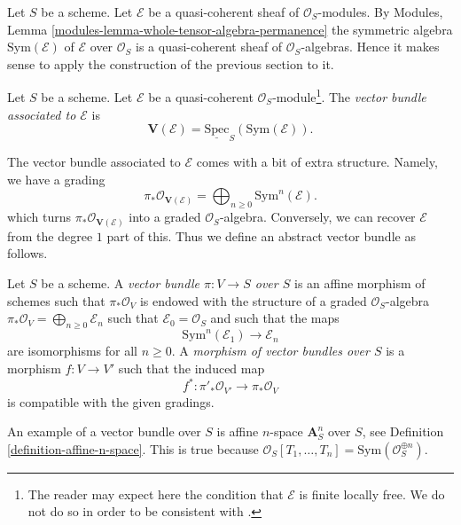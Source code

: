 \noindent
Let $S$ be a scheme.
Let $\mathcal{E}$ be a quasi-coherent sheaf of $\mathcal{O}_S$-modules.
By Modules, Lemma \ref{modules-lemma-whole-tensor-algebra-permanence}
the symmetric algebra $\text{Sym}(\mathcal{E})$ of
$\mathcal{E}$ over $\mathcal{O}_S$
is a quasi-coherent sheaf of $\mathcal{O}_S$-algebras.
Hence it makes sense to apply the construction of the
previous section to it.

\begin{definition}
\label{definition-vector-bundle}
Let $S$ be a scheme. Let $\mathcal{E}$ be a quasi-coherent
$\mathcal{O}_S$-module\footnote{The reader may expect here
the condition that $\mathcal{E}$ is finite locally free. We do not
do so in order to be consistent with \cite[II, Definition 1.7.8]{EGA}.}.
The {\it vector bundle associated to $\mathcal{E}$} is
$$
\mathbf{V}(\mathcal{E}) = \underline{\text{Spec}}_S(\text{Sym}(\mathcal{E})).
$$
\end{definition}

\noindent
The vector bundle associated to $\mathcal{E}$ comes with a bit
of extra structure. Namely, we have a grading
$$
\pi_*\mathcal{O}_{\mathbf{V}(\mathcal{E})} =
\bigoplus\nolimits_{n \geq 0} \text{Sym}^n(\mathcal{E}).
$$
which turns $\pi_*\mathcal{O}_{\mathbf{V}(\mathcal{E})}$
into a graded $\mathcal{O}_S$-algebra. Conversely, we can recover
$\mathcal{E}$ from the degree $1$ part of this.
Thus we define an abstract vector bundle as follows.

\begin{definition}
\label{definition-abstract-vector-bundle}
Let $S$ be a scheme. A {\it vector bundle $\pi : V \to S$ over $S$} is an
affine morphism of schemes such that $\pi_*\mathcal{O}_V$ is endowed with
the structure of a graded $\mathcal{O}_S$-algebra
$\pi_*\mathcal{O}_V = \bigoplus\nolimits_{n \geq 0} \mathcal{E}_n$
such that $\mathcal{E}_0 = \mathcal{O}_S$ and such that the maps
$$
\text{Sym}^n(\mathcal{E}_1) \longrightarrow \mathcal{E}_n
$$
are isomorphisms for all $n \geq 0$. A {\it morphism of vector bundles
over $S$} is a morphism $f : V \to V'$ such that the induced map
$$
f^* : \pi'_*\mathcal{O}_{V'} \longrightarrow \pi_*\mathcal{O}_V
$$
is compatible with the given gradings.
\end{definition}

\noindent
An example of a vector bundle over $S$ is affine $n$-space
$\mathbf{A}^n_S$ over $S$, see Definition \ref{definition-affine-n-space}.
This is true because
$\mathcal{O}_S[T_1, \ldots, T_n] = \text{Sym}(\mathcal{O}_S^{\oplus n})$.


